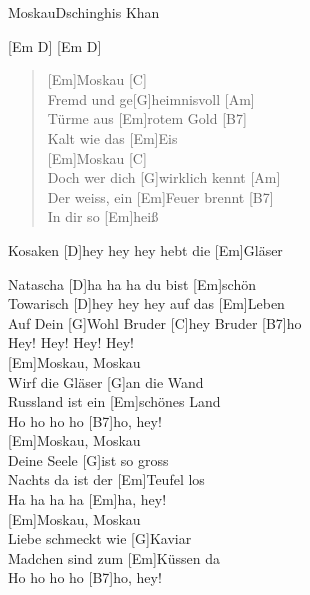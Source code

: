 \begin{song}{Moskau}{Dschinghis Khan}

        [Em D] [Em D]

    \begin{verse}
        [Em]Moskau [C] \\
        Fremd und ge[G]heimnisvoll [Am] \\
        Türme aus [Em]rotem Gold [B7] \\
        Kalt wie das [Em]Eis \\

        [Em]Moskau [C] \\
        Doch wer dich [G]wirklich kennt [Am] \\
        Der weiss, ein [Em]Feuer brennt [B7] \\
        In dir so [Em]heiß
    \end{verse}

        Kosaken [D]hey hey hey hebt die [Em]Gläser \\
    \begin{chorus}
        Natascha [D]ha ha ha du bist [Em]schön \\
        Towarisch [D]hey hey hey auf das [Em]Leben \\
        Auf Dein [G]Wohl Bruder [C]hey Bruder [B7]ho \\
        Hey! Hey! Hey! Hey! \\

        [Em]Moskau, Moskau \\
        [C]Wirf die Gläser [G]an die Wand \\
        [Am]Russland ist ein [Em]schönes Land \\
        [Am]Ho ho ho ho [B7]ho, hey! \\
         
        [Em]Moskau, Moskau \\
        [C]Deine Seele [G]ist so gross \\
        [Am]Nachts da ist der [Em]Teufel los \\
        [B7]Ha ha ha ha [Em]ha, hey! \\
         
        [Em]Moskau, Moskau \\
        [C]Liebe schmeckt wie [G]Kaviar \\
        [Am]Madchen sind zum [Em]Küssen da \\
        [Am]Ho ho ho ho [B7]ho, hey! \\
         

\end{chorus}
\end{song}
